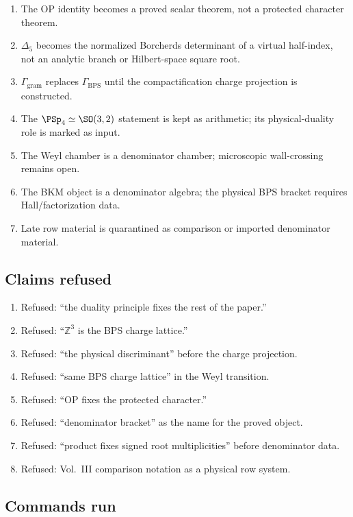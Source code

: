 \begin{enumerate}
\item The OP identity becomes a proved scalar theorem, not a protected
character theorem.
\item \(\Delta_5\) becomes the normalized Borcherds determinant of a
virtual half-index, not an analytic branch or Hilbert-space square root.
\item \(\Gamma_{\mathrm{gram}}\) replaces \(\Gamma_{\mathrm{BPS}}\) until
the compactification charge projection is constructed.
\item The \(\PSp_4\simeq\SO(3,2)\) statement is kept as arithmetic; its
physical-duality role is marked as input.
\item The Weyl chamber is a denominator chamber; microscopic
wall-crossing remains open.
\item The BKM object is a denominator algebra; the physical BPS bracket
requires Hall/factorization data.
\item Late row material is quarantined as comparison or imported
denominator material.
\end{enumerate}

\subsection{Claims refused}

\begin{enumerate}
\item Refused: ``the duality principle fixes the rest of the paper.''
\item Refused: ``\(\mathbb Z^3\) is the BPS charge lattice.''
\item Refused: ``the physical discriminant'' before the charge projection.
\item Refused: ``same BPS charge lattice'' in the Weyl transition.
\item Refused: ``OP fixes the protected character.''
\item Refused: ``denominator bracket'' as the name for the proved object.
\item Refused: ``product fixes signed root multiplicities'' before
denominator data.
\item Refused: Vol.~III comparison notation as a physical row system.
\end{enumerate}

\subsection{Commands run}

